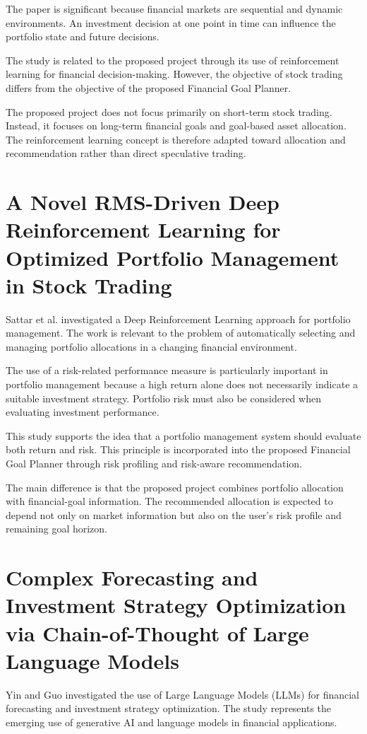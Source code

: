 The paper is significant because financial markets are sequential and dynamic environments. An investment decision at one point in time can influence the portfolio state and future decisions.

The study is related to the proposed project through its use of reinforcement learning for financial decision-making. However, the objective of stock trading differs from the objective of the proposed Financial Goal Planner.

The proposed project does not focus primarily on short-term stock trading. Instead, it focuses on long-term financial goals and goal-based asset allocation. The reinforcement learning concept is therefore adapted toward allocation and recommendation rather than direct speculative trading.

\section{A Novel RMS-Driven Deep Reinforcement Learning for Optimized Portfolio Management in Stock Trading}
Sattar et al. investigated a Deep Reinforcement Learning approach for portfolio management. The work is relevant to the problem of automatically selecting and managing portfolio allocations in a changing financial environment.

The use of a risk-related performance measure is particularly important in portfolio management because a high return alone does not necessarily indicate a suitable investment strategy. Portfolio risk must also be considered when evaluating investment performance.

This study supports the idea that a portfolio management system should evaluate both return and risk. This principle is incorporated into the proposed Financial Goal Planner through risk profiling and risk-aware recommendation.

The main difference is that the proposed project combines portfolio allocation with financial-goal information. The recommended allocation is expected to depend not only on market information but also on the user's risk profile and remaining goal horizon.

\section{Complex Forecasting and Investment Strategy Optimization via Chain-of-Thought of Large Language Models}
Yin and Guo investigated the use of Large Language Models (LLMs) for financial forecasting and investment strategy optimization. The study represents the emerging use of generative AI and language models in financial applications.

